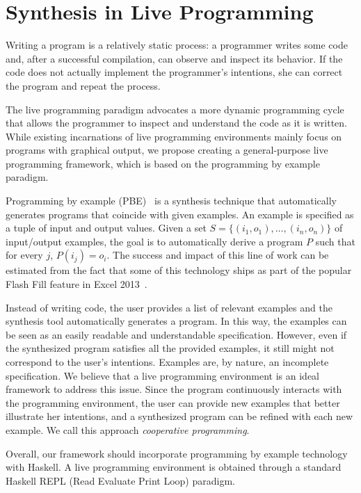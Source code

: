 \section{Synthesis in Live Programming}
\label{sec:goal}


Writing a program is a relatively static process: a programmer writes some code and, after a successful compilation, can observe and inspect its behavior. If the code does not actually implement the programmer's intentions, she can correct the program and repeat the process.

The live programming paradigm advocates a more dynamic programming cycle that allows the programmer to inspect and understand the code as it is written. While existing incarnations of live programming environments mainly focus on programs with graphical output, we propose creating a general-purpose live programming framework, which is based
on the programming by example paradigm. 

Programming by example (PBE)~\cite{cypher93,lieberman01,synasc12} is a synthesis technique that automatically generates programs that coincide with given examples. An example is specified as a tuple of input and output values. Given a set $S= \{(i_1, o_1),\ldots, (i_n, o_n)\}$ of input/output examples, the goal is to automatically derive a program $P$ such that for every $j$, $P(i_j) = o_i$. The success and impact of this line of work can be estimated from the fact that some of this technology ships as part of the popular Flash Fill feature in Excel 2013~\cite{flashFillPOPL}.

Instead of writing code, the user provides a list of relevant examples and the synthesis tool automatically generates a program. In this way, the examples can be seen as an easily readable and understandable specification. However, even if the synthesized program satisfies all the provided examples, it still might not correspond to the user's intentions. Examples are, by nature, an incomplete specification. We believe that a live programming environment is an ideal framework to address this issue. Since the program continuously interacts with the programming environment, the user can provide new examples that better illustrate her intentions, and a synthesized program can be refined with each new example. We call this approach {\emph{cooperative programming}}.

Overall, our framework should incorporate programming by example technology with
Haskell. A live programming environment is obtained through a standard
Haskell REPL (Read Evaluate Print Loop) paradigm. 

